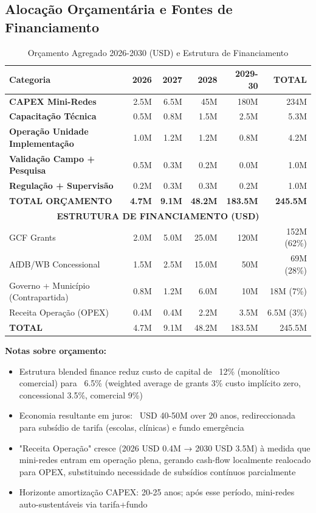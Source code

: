 \documentclass[12pt, a4paper]{article}
\begin{document}
{{{{{{{{{{{{{\subsection{Alocação Orçamentária e Fontes de Financiamento}

\begin{table}[H]
\centering
\caption{Orçamento Agregado 2026-2030 (USD) e Estrutura de Financiamento}
\label{tab:budget}
\small
\begin{tabular}{|l|r|r|r|r|r|}
\hline
\textbf{Categoria} & \textbf{2026} & \textbf{2027} & \textbf{2028} & \textbf{2029-30} & \textbf{TOTAL} \\
\hline
\textbf{CAPEX Mini-Redes} & 2.5M & 6.5M & 45M & 180M & 234M \\
\textbf{Capacitação Técnica} & 0.5M & 0.8M & 1.5M & 2.5M & 5.3M \\
\textbf{Operação Unidade Implementação} & 1.0M & 1.2M & 1.2M & 0.8M & 4.2M \\
\textbf{Validação Campo + Pesquisa} & 0.5M & 0.3M & 0.2M & 0.0M & 1.0M \\
\textbf{Regulação + Supervisão} & 0.2M & 0.3M & 0.3M & 0.2M & 1.0M \\
\hline
\textbf{TOTAL ORÇAMENTO} & \textbf{4.7M} & \textbf{9.1M} & \textbf{48.2M} & \textbf{183.5M} & \textbf{245.5M} \\
\hline
\multicolumn{6}{|c|}{\textbf{ESTRUTURA DE FINANCIAMENTO (USD)}} \\
\hline
GCF Grants & 2.0M & 5.0M & 25.0M & 120M & 152M (62\%) \\
AfDB/WB Concessional & 1.5M & 2.5M & 15.0M & 50M & 69M (28\%) \\
Governo + Município (Contrapartida) & 0.8M & 1.2M & 6.0M & 10M & 18M (7\%) \\
Receita Operação (OPEX) & 0.4M & 0.4M & 2.2M & 3.5M & 6.5M (3\%) \\
\hline
\textbf{TOTAL} & 4.7M & 9.1M & 48.2M & 183.5M & 245.5M \\
\hline
\end{tabular}
\end{table}

\textbf{Notas sobre orçamento:}
\begin{itemize}
\item Estrutura blended finance reduz custo de capital de ~12\% (monolítico comercial) para ~6.5\% (weighted average de grants 3\% custo implícito zero, concessional 3.5\%, comercial 9\%)
\item Economia resultante em juros: ~USD 40-50M over 20 anos, redireccionada para subsídio de tarifa (escolas, clínicas) e fundo emergência
\item "Receita Operação" cresce (2026 USD 0.4M → 2030 USD 3.5M) à medida que mini-redes entram em operação plena, gerando cash-flow localmente realocado para OPEX, substituindo necessidade de subsídios contínuos parcialmente
\item Horizonte amortização CAPEX: 20-25 anos;
 após esse período, mini-redes auto-sustentáveis via tarifa+fundo
\end{itemize}

}}}}}}}}}}}}}
\end{document}
